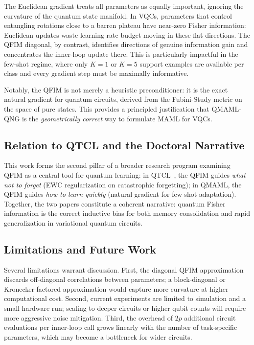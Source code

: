 \documentclass[a4paper,nopdfoutputerror]{quantumarticle}
\begin{document}
The Euclidean gradient treats all parameters as equally important,
ignoring the curvature of the quantum state manifold.
In VQCs, parameters that control entangling rotations close to a barren
plateau have near-zero Fisher information: Euclidean updates waste learning
rate budget moving in these flat directions.
The QFIM diagonal, by contrast, identifies directions of genuine information
gain and concentrates the inner-loop update there.
This is particularly impactful in the few-shot regime, where only $K=1$ or
$K=5$ support examples are available per class and every gradient step must
be maximally informative.

Notably, the QFIM is not merely a heuristic preconditioner: it is the exact
natural gradient for quantum circuits, derived from the Fubini-Study metric
on the space of pure states.
This provides a principled justification that QMAML-QNG is the
\emph{geometrically correct} way to formulate MAML for VQCs.

\subsection{Relation to QTCL and the Doctoral Narrative}

This work forms the second pillar of a broader research program examining
QFIM as a central tool for quantum learning:
in QTCL~\cite{chen2022quantumcl}, the QFIM guides \emph{what not to forget}
(EWC regularization on catastrophic forgetting);
in QMAML, the QFIM guides \emph{how to learn quickly} (natural gradient
for few-shot adaptation).
Together, the two papers constitute a coherent narrative:
quantum Fisher information is the correct inductive bias for both memory
consolidation and rapid generalization in variational quantum circuits.

\subsection{Limitations and Future Work}

Several limitations warrant discussion.
First, the diagonal QFIM approximation discards off-diagonal correlations
between parameters; a block-diagonal or Kronecker-factored approximation
would capture more curvature at higher computational cost.
Second, current experiments are limited to simulation and a small hardware
run; scaling to deeper circuits or higher qubit counts will require
more aggressive noise mitigation.
Third, the overhead of $2p$ additional circuit evaluations per inner-loop
call grows linearly with the number of task-specific parameters, which may
become a bottleneck for wider circuits.
\end{document}
